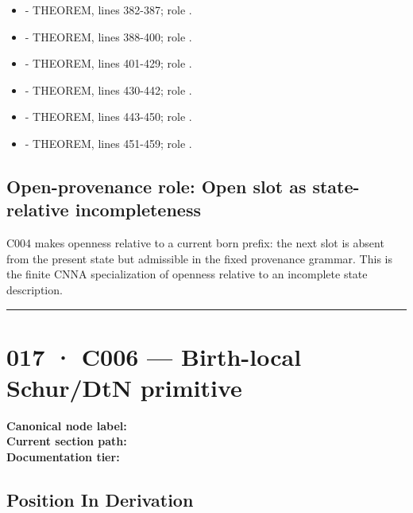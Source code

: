 \begin{itemize}
\item
  \texttt{\protect{}} - THEOREM, lines 382-387; role
  \texttt{\protect{}}.
\item
  \texttt{\protect{}} - THEOREM, lines 388-400; role
  \texttt{\protect{}}.
\item
  \texttt{\protect{}} - THEOREM, lines 401-429; role \texttt{\protect{}}.
\item
  \texttt{\protect{}} - THEOREM, lines 430-442; role
  \texttt{\protect{}}.
\item
  \texttt{\protect{}} - THEOREM, lines 443-450; role
  \texttt{\protect{}}.
\item
  \texttt{\protect{}} - THEOREM, lines 451-459; role
  \texttt{\protect{}}.
\end{itemize}

\subsection{Open-provenance role: Open slot as state-relative
incompleteness}\label{open-provenance-role-open-slot-as-state-relative-incompleteness}

C004 makes openness relative to a current born prefix: the next slot is
absent from the present state but admissible in the fixed provenance
grammar. This is the finite CNNA specialization of openness relative to
an incomplete state description.

\begin{center}\rule{0.5\linewidth}{0.5pt}\end{center}

\section{017 · C006 --- Birth-local Schur/DtN
primitive}\label{c006-birth-local-schurdtn-primitive}

\textbf{Canonical node label:} \texttt{\protect{}}\\
\textbf{Current section path:} \texttt{\protect{}}\\
\textbf{Documentation tier:} \texttt{\protect{}}

\subsection{Position In Derivation}\label{position-in-derivation-13}


